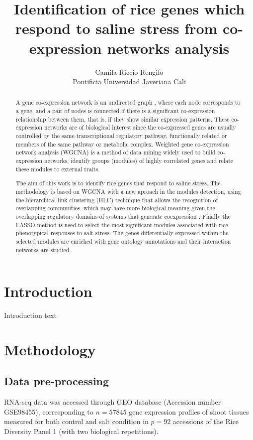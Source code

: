 \documentclass[conference]{IEEEtran}
\title{Identification of rice genes which respond to saline stress from co-expression networks analysis}
\author{Camila Riccio Rengifo\\
  \small Pontificia Universidad Javeriana Cali\\
}
\begin{document}
\maketitle

\begin{abstract}
A gene co-expression network is an undirected graph , where each node corresponds to a gene, and a pair of nodes is connected if there is a significant co-expression relationship between them, that is, if they show similar expression patterns. These co-expression networks are of biological interest since the co-expressed genes are usually controlled by the same transcriptional regulatory pathway, functionally related or members of the same pathway or metabolic complex. Weighted gene co-expression network analysis (WGCNA)  is a method of data mining widely used to build co-expression networks, identify groups (modules) of highly correlated genes and relate these modules to external traits.

The aim of this work is to identify rice genes that respond to saline stress. The methodology is based on WGCNA with a new aproach in the modules detection, using  the hierarchical link clustering (HLC) technique that allows the recognition of overlapping communities, which may have more biological meaning given the overlapping regulatory domains of systems that generate coexpression \cite{gaiteri2014beyond}. Finally the LASSO method is used to select the most significant modules associated with rice phenotypical responses to salt stress. The genes differentially expressed within the selected modules are enriched with gene ontology annotations and their interaction networks are studied.
\end{abstract}


\section*{Introduction}
Introduction text

\section{Methodology}
\subsection{Data pre-processing} 
RNA-seq data was accessed through GEO database \cite{GEOAcces90:online} (Accession number GSE98455), corresponding to $n=57845$ gene expression profiles of shoot tissues measured for both control and salt condition in $p=92$ accessions of the Rice Diversity Panel 1 (with two biological repetitions). \\
\end{document}
